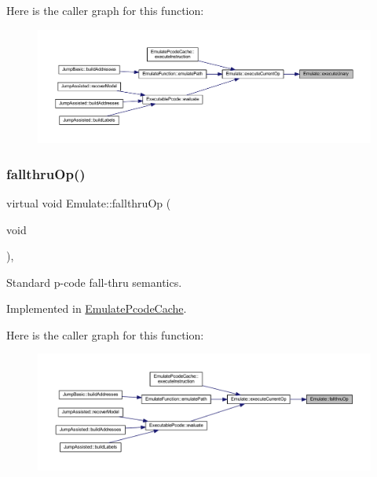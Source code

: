 Here is the caller graph for this function\+:
\nopagebreak
\begin{figure}[H]
\begin{center}
\leavevmode
\includegraphics[width=350pt]{class_emulate_a95111238fb3061b23db2e94ec280b34f_icgraph}
\end{center}
\end{figure}
\mbox{\label{class_emulate_ae9cd5b56525c54479e9c7add4a17687b}} 
\subsubsection{\texorpdfstring{fallthruOp()}{fallthruOp()}}
{\footnotesize\ttfamily virtual void Emulate\+::fallthru\+Op (\begin{DoxyParamCaption}\item[{void}]{ }\end{DoxyParamCaption})\hspace{0.3cm}{\ttfamily [protected]}, {}}



Standard p-\/code fall-\/thru semantics. 



Implemented in \mbox{\hyperlink{class_emulate_pcode_cache_a57be50a3c9751a6bcb40bf8c080f7774}{Emulate\+Pcode\+Cache}}.

Here is the caller graph for this function\+:
\nopagebreak
\begin{figure}[H]
\begin{center}
\leavevmode
\includegraphics[width=350pt]{class_emulate_ae9cd5b56525c54479e9c7add4a17687b_icgraph}
\end{center}
\end{figure}
\mbox{\label{class_emulate_aeca3c773876b391304afffe2a5eff9de}} 
